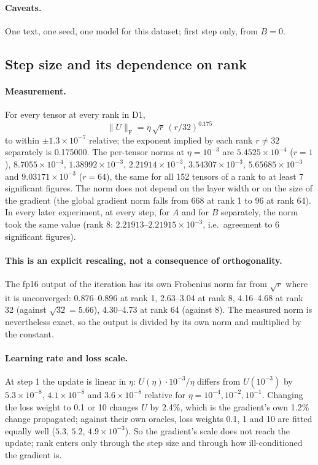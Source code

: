 \documentclass[11pt]{article}
\newcommand{\fro}{\mathrm{F}}
\begin{document}
\paragraph{Caveats.} One text, one seed, one model for this dataset; first step only, from $B=0$.

\subsection{Step size and its dependence on rank}\label{sec:ev-size}
\paragraph{Measurement.} For every tensor at every rank in D1,
\[
\|U\|_\fro=\eta\,\sqrt r\,(r/32)^{0.175}
\]
to within $\pm1.3\times10^{-7}$ relative; the exponent implied by each rank $r\neq32$ separately is
0.175000. The per-tensor norms at $\eta=10^{-3}$ are $5.4525\times10^{-4}$ ($r=1$),
$8.7055\times10^{-4}$, $1.38992\times10^{-3}$, $2.21914\times10^{-3}$, $3.54307\times10^{-3}$,
$5.65685\times10^{-3}$ and $9.03171\times10^{-3}$ ($r=64$), the same for all 152 tensors of a rank
to at least 7 significant figures. The norm does not depend on the layer width or on the size of
the gradient (the global gradient norm falls from 668 at rank 1 to 96 at rank 64). In every later
experiment, at every step, for $A$ and for $B$ separately, the norm took the same value (rank 8:
$2.21913$--$2.21915\times10^{-3}$, i.e.\ agreement to 6 significant figures).

\paragraph{This is an explicit rescaling, not a consequence of orthogonality.} The fp16 output of
the iteration has its own Frobenius norm far from $\sqrt r$ where it is unconverged:
0.876--0.896 at rank 1, 2.63--3.04 at rank 8, 4.16--4.68 at rank 32 (against $\sqrt{32}=5.66$),
4.30--4.73 at rank 64 (against 8). The measured norm is nevertheless exact, so the output is
divided by its own norm and multiplied by the constant.

\paragraph{Learning rate and loss scale.} At step 1 the update is linear in $\eta$:
$U(\eta)\cdot10^{-3}/\eta$ differs from $U(10^{-3})$ by $5.3\times10^{-8}$, $4.1\times10^{-8}$ and
$3.6\times10^{-8}$ relative for $\eta=10^{-4},10^{-2},10^{-1}$. Changing the loss weight to 0.1 or 10
changes $U$ by 2.4\%, which is the gradient's own 1.2\% change propagated; against their own
oracles, loss weights 0.1, 1 and 10 are fitted equally well ($5.3$, $5.2$, $4.9\times10^{-3}$). So
the gradient's scale does not reach the update; rank enters only through the step size and through
how ill-conditioned the gradient is.
\end{document}
